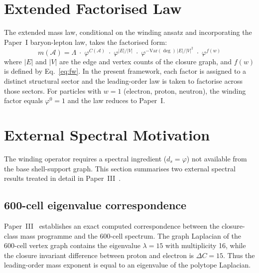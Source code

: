 \documentclass[12pt]{article}
\newcommand{\Acal}{\mathcal{A}}
\newcommand{\phig}{\varphi}
\newcommand{\ds}{d_s}
\begin{document}
\section{Extended Factorised Law}\label{sec:unified}

The extended mass law, conditional on the winding ansatz and incorporating the Paper~I baryon-lepton law, takes the factorised form:
\begin{equation}\label{eq:unified}
    m(\Acal) = \Lambda \;\cdot\; \phig^{C(\Acal)} \;\cdot\; \phig^{|E|/|V|} \;\cdot\; \phig^{-\mathrm{Var}(\deg)\,|E|/|V|^2} \;\cdot\; \phig^{f(w)}
\end{equation}
where $|E|$ and $|V|$ are the edge and vertex counts of the closure graph, and $f(w)$ is defined by Eq.~\eqref{eq:fw}. In the present framework, each factor is assigned to a distinct structural sector and the leading-order law is taken to factorise across those sectors. For particles with $w = 1$ (electron, proton, neutron), the winding factor equals $\phig^0 = 1$ and the law reduces to Paper~I.

\section{External Spectral Motivation}\label{sec:motivation}

The winding operator requires a spectral ingredient ($\ds = \phig$) not available from the base shell-support graph. This section summarises two external spectral results treated in detail in Paper~III~\citep{SmartIII}.

\subsection{600-cell eigenvalue correspondence}\label{sec:600cell}

Paper~III~\citep{SmartIII} establishes an exact computed correspondence between the closure-class mass programme and the 600-cell spectrum. The graph Laplacian of the 600-cell vertex graph contains the eigenvalue $\lambda = 15$ with multiplicity 16, while the closure invariant difference between proton and electron is $\Delta C = 15$. Thus the leading-order mass exponent is equal to an eigenvalue of the polytope Laplacian.
\end{document}
